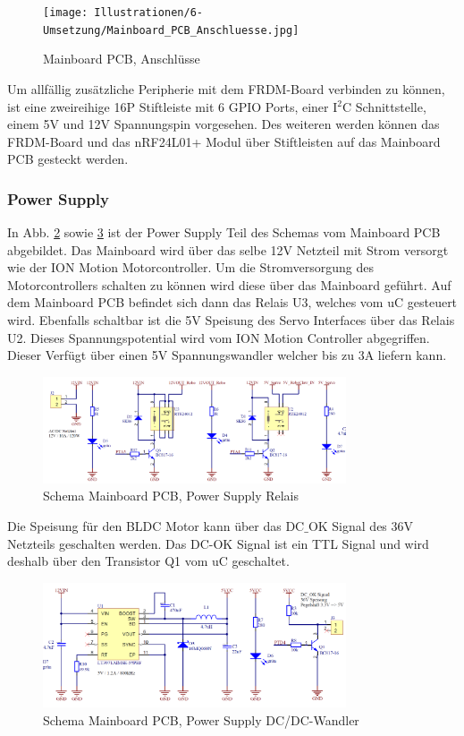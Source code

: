 \begin{figure}[H]
	\texttt{[image: Illustrationen/6-Umsetzung/Mainboard\_PCB\_Anschluesse.jpg]}
	\caption{Mainboard PCB, Anschlüsse}
	\label{fig:Mainboard_3D}
\end{figure}

Um allfällig zusätzliche Peripherie mit dem FRDM-Board verbinden zu können, ist eine zweireihige 16P Stiftleiste mit 6 GPIO Ports, einer I$^{2}$C Schnittstelle, einem 5V und 12V Spannungspin vorgesehen. Des weiteren werden können das FRDM-Board und das nRF24L01+ Modul über Stiftleisten auf das Mainboard PCB gesteckt werden.

\subsubsection{Power Supply}
In Abb. \ref{fig:Schema_Mainboard_PowerSupply_1} sowie \ref{fig:Schema_Mainboard_PowerSupply_2} ist der Power Supply Teil des Schemas vom Mainboard PCB abgebildet. Das Mainboard wird über das selbe 12V Netzteil mit Strom versorgt wie der ION Motion Motorcontroller. Um die Stromversorgung des Motorcontrollers schalten zu können wird diese über das Mainboard geführt. Auf dem Mainboard PCB befindet sich dann das Relais U3, welches vom uC gesteuert wird. Ebenfalls schaltbar ist die 5V Speisung des Servo Interfaces über das Relais U2. Dieses Spannungspotential wird vom ION Motion Controller abgegriffen. Dieser Verfügt über einen 5V Spannungswandler welcher bis zu 3A liefern kann. 

\begin{figure}[H]
	\includegraphics[width=0.8\textwidth]{Illustrationen/6-Umsetzung/Schema_Mainboard_PowerSupply_1.png}
	\caption{Schema Mainboard PCB, Power Supply Relais}
	\label{fig:Schema_Mainboard_PowerSupply_1}
\end{figure}

Die Speisung für den BLDC Motor kann über das DC$\_$OK Signal des 36V Netzteils geschalten werden. Das DC-OK Signal ist ein TTL Signal und wird deshalb über den Transistor Q1 vom uC geschaltet.

\begin{figure}[H]
	\includegraphics[width=0.8\textwidth]{Illustrationen/6-Umsetzung/Schema_Mainboard_PowerSupply_2.png}
	\caption{Schema Mainboard PCB, Power Supply DC/DC-Wandler}
	\label{fig:Schema_Mainboard_PowerSupply_2}
\end{figure}


